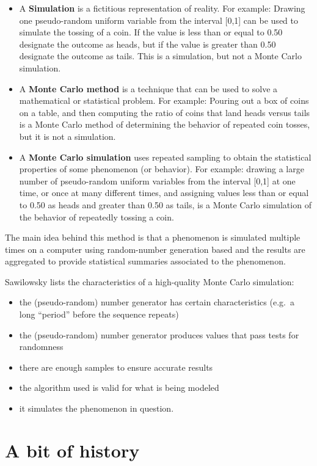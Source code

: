 \documentclass[
]{book}
\begin{document}
\begin{itemize}
\item
  A \textbf{Simulation} is a fictitious representation of reality. For example: Drawing one pseudo-random uniform variable from the interval {[}0,1{]} can be used to simulate the tossing of a coin. If the value is less than or equal to 0.50 designate the outcome as heads, but if the value is greater than 0.50 designate the outcome as tails. This is a simulation, but not a Monte Carlo simulation.
\item
  A \textbf{Monte Carlo method} is a technique that can be used to solve a mathematical or statistical problem. For example: Pouring out a box of coins on a table, and then computing the ratio of coins that land heads versus tails is a Monte Carlo method of determining the behavior of repeated coin tosses, but it is not a simulation.
\item
  A \textbf{Monte Carlo simulation} uses repeated sampling to obtain the statistical properties of some phenomenon (or behavior). For example: drawing a large number of pseudo-random uniform variables from the interval {[}0,1{]} at one time, or once at many different times, and assigning values less than or equal to 0.50 as heads and greater than 0.50 as tails, is a Monte Carlo simulation of the behavior of repeatedly tossing a coin.
\end{itemize}

The main idea behind this method is that a phenomenon is simulated multiple times on a computer using random-number generation based and the results are aggregated to provide statistical summaries associated to the phenomenon.

Sawilowsky lists the characteristics of a high-quality Monte Carlo simulation:

\begin{itemize}
\item
  the (pseudo-random) number generator has certain characteristics (e.g.~a long ``period'' before the sequence repeats)
\item
  the (pseudo-random) number generator produces values that pass tests for randomness
\item
  there are enough samples to ensure accurate results
\item
  the algorithm used is valid for what is being modeled
\item
  it simulates the phenomenon in question.
\end{itemize}

\hypertarget{a-bit-of-history}{%
\section{A bit of history}\label{a-bit-of-history}}
\end{document}
